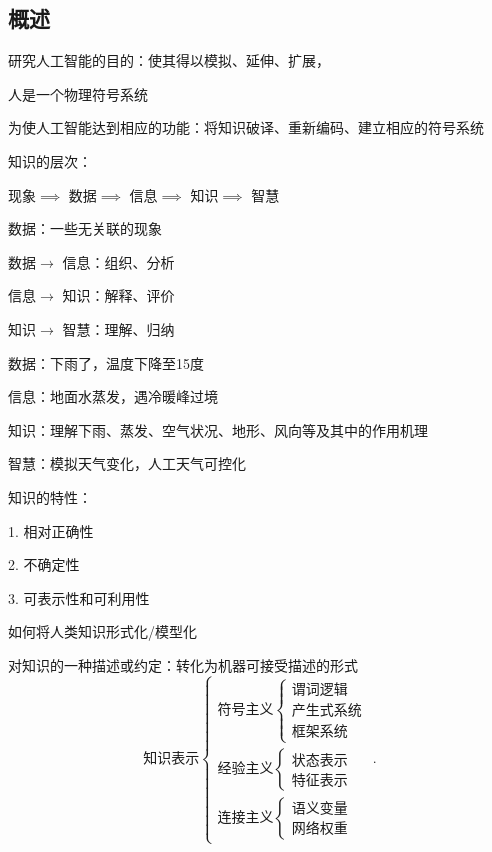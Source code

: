 \subsection{概述}%
\label{sub:概述}
研究人工智能的目的：使其得以模拟、延伸、扩展，
\begin{notation}
    人是一个物理符号系统
\end{notation}
为使人工智能达到相应的功能：将知识破译、重新编码、建立相应的符号系统
\begin{notation}
    知识的层次：

    现象$\implies$ 数据$\implies$ 信息$\implies$ 知识$\implies$ 智慧

    数据：一些无关联的现象

    数据$\to$ 信息：组织、分析

    信息$\to$ 知识：解释、评价

    知识$\to$ 智慧：理解、归纳
\end{notation}
\begin{eg}
    数据：下雨了，温度下降至15度

    信息：地面水蒸发，遇冷暖峰过境

    知识：理解下雨、蒸发、空气状况、地形、风向等及其中的作用机理

    智慧：模拟天气变化，人工天气可控化
\end{eg}
\begin{notation}
    知识的特性：

    1. 相对正确性

    2. 不确定性

    3. 可表示性和可利用性
\end{notation}
\begin{question}
    如何将人类知识形式化/模型化
\end{question}
对知识的一种描述或约定：转化为机器可接受描述的形式
\[
    \text{知识表示}
    \begin{cases}
        \text{符号主义}\begin{cases}
            \text{谓词逻辑}\\
            \text{产生式系统}\\
            \text{框架系统}
        \end{cases}\\
        \text{经验主义}\begin{cases}
            \text{状态表示}\\
            \text{特征表示}
        \end{cases}\\
        \text{连接主义}\begin{cases}
            \text{语义变量}\\
            \text{网络权重}
        \end{cases}
    \end{cases}
.\] 
